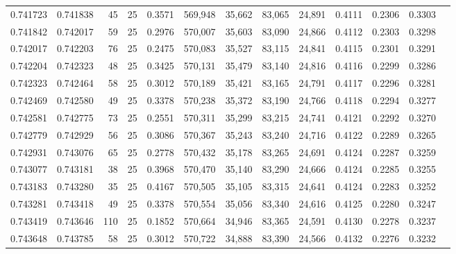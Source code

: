 \begin{tabular}{rrrrrrrrrrrrr}
0.741723 & 0.741838 &    45 &  25 &                                     0.3571 & 569,948 &  35,662 &  83,065 &  24,891 & 0.4111 & 0.2306 & 0.3303 \\
0.741842 & 0.742017 &    59 &  25 &                                     0.2976 & 570,007 &  35,603 &  83,090 &  24,866 & 0.4112 & 0.2303 & 0.3298 \\
0.742017 & 0.742203 &    76 &  25 &                                     0.2475 & 570,083 &  35,527 &  83,115 &  24,841 & 0.4115 & 0.2301 & 0.3291 \\
0.742204 & 0.742323 &    48 &  25 &                                     0.3425 & 570,131 &  35,479 &  83,140 &  24,816 & 0.4116 & 0.2299 & 0.3286 \\
0.742323 & 0.742464 &    58 &  25 &                                     0.3012 & 570,189 &  35,421 &  83,165 &  24,791 & 0.4117 & 0.2296 & 0.3281 \\
0.742469 & 0.742580 &    49 &  25 &                                     0.3378 & 570,238 &  35,372 &  83,190 &  24,766 & 0.4118 & 0.2294 & 0.3277 \\
0.742581 & 0.742775 &    73 &  25 &                                     0.2551 & 570,311 &  35,299 &  83,215 &  24,741 & 0.4121 & 0.2292 & 0.3270 \\
0.742779 & 0.742929 &    56 &  25 &                                     0.3086 & 570,367 &  35,243 &  83,240 &  24,716 & 0.4122 & 0.2289 & 0.3265 \\
0.742931 & 0.743076 &    65 &  25 &                                     0.2778 & 570,432 &  35,178 &  83,265 &  24,691 & 0.4124 & 0.2287 & 0.3259 \\
0.743077 & 0.743181 &    38 &  25 &                                     0.3968 & 570,470 &  35,140 &  83,290 &  24,666 & 0.4124 & 0.2285 & 0.3255 \\
0.743183 & 0.743280 &    35 &  25 &                                     0.4167 & 570,505 &  35,105 &  83,315 &  24,641 & 0.4124 & 0.2283 & 0.3252 \\
0.743281 & 0.743418 &    49 &  25 &                                     0.3378 & 570,554 &  35,056 &  83,340 &  24,616 & 0.4125 & 0.2280 & 0.3247 \\
0.743419 & 0.743646 &   110 &  25 &                                     0.1852 & 570,664 &  34,946 &  83,365 &  24,591 & 0.4130 & 0.2278 & 0.3237 \\
0.743648 & 0.743785 &    58 &  25 &                                     0.3012 & 570,722 &  34,888 &  83,390 &  24,566 & 0.4132 & 0.2276 & 0.3232 \\

\end{tabular}
